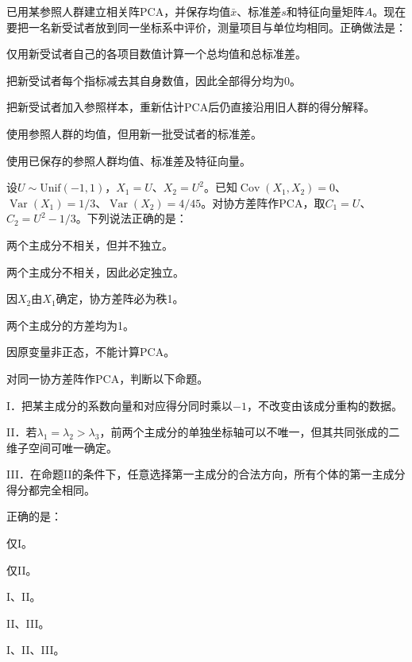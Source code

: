 \par\noindent\begin{minipage}{\linewidth}
已用某参照人群建立相关阵PCA，并保存均值$\bar x$、标准差$s$和特征向量矩阵$A$。现在要把一名新受试者放到同一坐标系中评价，测量项目与单位均相同。正确做法是：
\begin{choices}
\item 仅用新受试者自己的各项目数值计算一个总均值和总标准差。
\item 把新受试者每个指标减去其自身数值，因此全部得分均为0。
\item 把新受试者加入参照样本，重新估计PCA后仍直接沿用旧人群的得分解释。
\item 使用参照人群的均值，但用新一批受试者的标准差。
\item 使用已保存的参照人群均值、标准差及特征向量。
\end{choices}
\end{minipage}\par\medskip

\par\noindent\begin{minipage}{\linewidth}
设$U\sim\mathrm{Unif}(-1,1)$，$X_1=U$、$X_2=U^2$。已知$\operatorname{Cov}(X_1,X_2)=0$、$\operatorname{Var}(X_1)=1/3$、$\operatorname{Var}(X_2)=4/45$。对协方差阵作PCA，取$C_1=U$、$C_2=U^2-1/3$。下列说法正确的是：
\begin{choices}
\item 两个主成分不相关，但并不独立。
\item 两个主成分不相关，因此必定独立。
\item 因$X_2$由$X_1$确定，协方差阵必为秩1。
\item 两个主成分的方差均为1。
\item 因原变量非正态，不能计算PCA。
\end{choices}
\end{minipage}\par\medskip

\par\noindent\begin{minipage}{\linewidth}
对同一协方差阵作PCA，判断以下命题。\par I．把某主成分的系数向量和对应得分同时乘以$-1$，不改变由该成分重构的数据。\par II．若$\lambda_1=\lambda_2>\lambda_3$，前两个主成分的单独坐标轴可以不唯一，但其共同张成的二维子空间可唯一确定。\par III．在命题II的条件下，任意选择第一主成分的合法方向，所有个体的第一主成分得分都完全相同。\par 正确的是：
\begin{choices}
\item 仅I。
\item 仅II。
\item I、II。
\item II、III。
\item I、II、III。
\end{choices}
\end{minipage}\par\medskip

